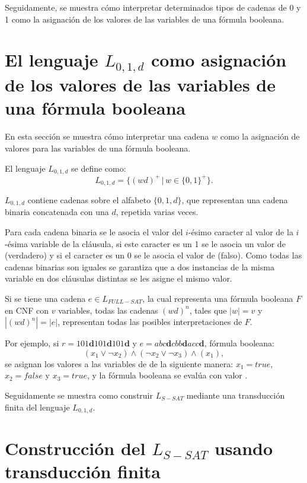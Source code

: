 Seguidamente, se muestra cómo interpretar determinados tipos de cadenas de 0 y 1 como la asignación de los valores de las variables de una fórmula booleana.

\section{El lenguaje $L_{0,1,d}$ como asignación de los valores de las variables de una fórmula booleana}
\label{sec:intsat}

En esta sección se muestra cómo interpretar una cadena $w$ como la asignación de valores para las variables
de una fórmula booleana.

\begin{definition}
    El lenguaje $L_{0,1,d}$ se define como:
    $$L_{0,1,d}=\{(wd)^+\,|\,w\in\{0,1\}^+\}.$$
    
    $L_{0,1,d}$ contiene cadenas sobre el alfabeto $\{0,1,d\}$, que representan una cadena binaria concatenada con una $d$,
    repetida varias veces.
\end{definition}

Para cada cadena binaria se le asocia el valor del $i$-ésimo caracter al valor de la $i$-ésima variable
de la cláusula, si este caracter es un 1 se le asocia un valor de \true{} (verdadero) y si el caracter es un 
0 se le asocia el valor de \false{} (falso). Como todas las cadenas binarias son iguales se garantiza que a dos instancias de la misma variable en dos cláusulas distintas se les asigne el mismo valor.

Si se tiene una cadena $e\in L_{FULL-SAT}$, la cual representa una fórmula booleana $F$ en CNF con $v$ variables,
todas las cadenas $(wd)^n$, tales que $|w|=v$ y $|(wd)^n|=|e|$, representan todas las posibles interpretaciones
de $F$.

Por ejemplo, si $r=101\mathbf{d}101\mathbf{d}101\mathbf{d}$ y $e=abc\mathbf{d}cbb\mathbf{d}acc\mathbf{d}$, fórmula booleana:
$$(x_1\vee\neg x_2)\wedge (\neg x_2 \vee \neg x_3)\wedge (x_1),$$
se asignan los valores a las variables de de la siguiente manera: $x_1=true$, $x_2=false$ y $x_3=true$,
y la fórmula booleana se evalúa con valor \true{}.

Seguidamente se muestra como construir $L_{S-SAT}$ mediante una transducción finita del lenguaje $L_{0,1,d}$.

\section{Construcción del $L_{S-SAT}$ usando transducción finita}

